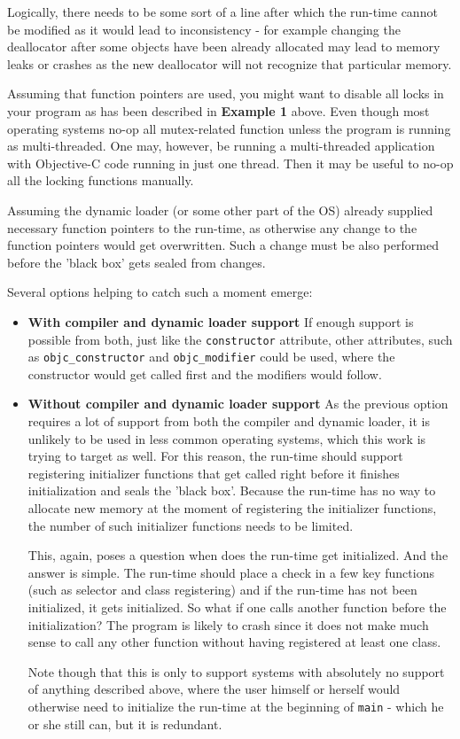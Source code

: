 Logically, there needs to be some sort of a line after which the run-time cannot be modified as it would lead to inconsistency - for example changing the deallocator after some objects have been already allocated may lead to memory leaks or crashes as the new deallocator will not recognize that particular memory.

Assuming that function pointers are used, you might want to disable all locks in your program as has been described in \textbf{Example 1} above. Even though most operating systems no-op all mutex-related function unless the program is running as multi-threaded. One may, however, be running a multi-threaded application with Objective-C code running in just one thread. Then it may be useful to no-op all the locking functions manually.

Assuming the dynamic loader (or some other part of the OS) already supplied necessary function pointers to the run-time, as otherwise any change to the function pointers would get overwritten. Such a change must be also performed before the 'black box' gets sealed from changes.

Several options helping to catch such a moment emerge:

\begin{itemize}
  \item{\bf{With compiler and dynamic loader support}} If enough support is possible from both, just like the \verb=constructor= attribute, other attributes, such as \verb=objc_constructor= and \verb=objc_modifier= could be used, where the constructor would get called first and the modifiers would follow.
  \item{\bf{Without compiler and dynamic loader support}} As the previous option requires a lot of support from both the compiler and dynamic loader, it is unlikely to be used in less common operating systems, which this work is trying to target as well. For this reason, the run-time should support registering initializer functions that get called right before it finishes initialization and seals the 'black box'. Because the run-time has no way to allocate new memory at the moment of registering the initializer functions, the number of such initializer functions needs to be limited.
  
  This, again, poses a question when does the run-time get initialized. And the answer is simple. The run-time should place a check in a few key functions (such as selector and class registering) and if the run-time has not been initialized, it gets initialized. So what if one calls another function before the initialization? The program is likely to crash since it does not make much sense to call any other function without having registered at least one class.
  
  Note though that this is only to support systems with absolutely no support of anything described above, where the user himself or herself would otherwise need to initialize the run-time at the beginning of \verb=main= - which he or she still can, but it is redundant.
\end{itemize}

